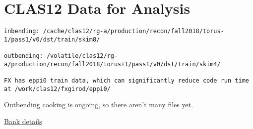 \section{CLAS12 Data for Analysis}
\begin{lstlisting}
inbending: /cache/clas12/rg-a/production/recon/fall2018/torus-1/pass1/v0/dst/train/skim8/

outbending: /volatile/clas12/rg-a/production/recon/fall2018/torus+1/pass1/v0/dst/train/skim4/

FX has eppi0 train data, which can significantly reduce code run time at /work/clas12/fxgirod/eppi0/

\end{lstlisting}

Outbending cooking is ongoing, so there aren’t many files yet.


\href{https://clasweb.jlab.org/wiki/index.php/CLAS12_DSTs}{Bank details}